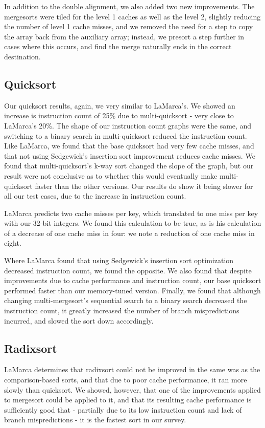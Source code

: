 In addition to the double alignment, we also added two new improvements. The
mergesorts were tiled for the level 1 caches as well as the level 2, slightly
reducing the number of level 1 cache misses, and we removed the need for a step
to copy the array back from the auxiliary array; instead, we presort a step
further in cases where this occurs, and find the merge naturally ends in the
correct destination.


\subsection{Quicksort}

Our quicksort results, again, we very similar to LaMarca's. We showed an
increase is instruction count of 25\% due to multi-quicksort - very close to
LaMarca's 20\%. The shape of our instruction count graphs were the same, and
switching to a binary search in multi-quicksort reduced the instruction count.
Like LaMarca, we found that the base quicksort had very few cache misses, and
that not using Sedgewick's insertion sort improvement reduces cache misses. We
found that multi-quicksort's k-way sort changed the slope of the graph, but our
result were not conclusive as to whether this would eventually make
multi-quicksort faster than the other versions. Our results do show it being
slower for all our test cases, due to the increase in instruction count.

LaMarca predicts two cache misses per key, which translated to one miss per key
with our 32-bit integers. We found this calculation to be true, as is his
calculation of a decrease of one cache miss in four: we note a reduction of one
cache miss in eight.

Where LaMarca found that using Sedgewick's insertion sort optimization decreased
instruction count, we found the opposite. We also found that despite
improvements due to cache performance and instruction count, our base quicksort
performed faster than our memory-tuned version. Finally, we found that although
changing multi-mergesort's sequential search to a binary search decreased the
instruction count, it greatly increased the number of branch mispredictions
incurred, and slowed the sort down accordingly.


\subsection{Radixsort}

LaMarca determines that radixsort could not be improved in the same was as the
comparison-based sorts, and that due to poor cache performance, it ran more
slowly than quicksort. We showed, however, that one of the improvements applied
to mergesort could be applied to it, and that its resulting cache performance is
sufficiently good that - partially due to its low instruction count and lack of
branch mispredictions - it is the fastest sort in our survey.


